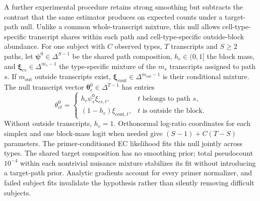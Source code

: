 \documentclass[11pt]{article}
\begin{document}
A further experimental procedure retains strong smoothing but subtracts the contrast that the same estimator produces on expected counts under a target-path null. Unlike a common whole-transcript mixture, this null allows cell-type-specific transcript shares within each path and cell-type-specific outside-block abundance. For one subject with \(C\) observed types, \(T\) transcripts and \(S\geq2\) paths, let \(\boldsymbol\psi^0\in\Delta^{S-1}\) be the shared path composition, \(h_c\in(0,1]\) the block mass, and \(\boldsymbol\xi_{cs}\in\Delta^{m_s-1}\) the type-specific mixture of the \(m_s\) transcripts assigned to path \(s\). If \(m_{\mathrm{out}}\) outside transcripts exist, \(\boldsymbol\xi_{c\mathrm{out}}\in\Delta^{m_{\mathrm{out}}-1}\) is their conditional mixture. The null transcript vector \(\boldsymbol\theta_c^0\in\Delta^{T-1}\) has entries \begin{equation}\theta^0_{ct}=\begin{cases}h_c\psi^0_s\xi_{cs,t},&t\text{ belongs to path }s,\\(1-h_c)\xi_{c\mathrm{out},t},&t\text{ is outside the block}.\end{cases}\end{equation} Without outside transcripts, \(h_c=1\). Orthonormal log-ratio coordinates for each simplex and one block-mass logit when needed give \((S-1)+C(T-S)\) parameters. The primer-conditioned EC likelihood fits this null jointly across types. The shared target composition has no smoothing prior; total pseudocount \(10^{-4}\) within each nontrivial nuisance mixture stabilizes its fit without introducing a target-path prior. Analytic gradients account for every primer normalizer, and failed subject fits invalidate the hypothesis rather than silently removing difficult subjects.
\end{document}
